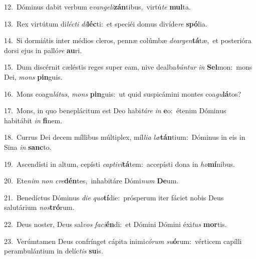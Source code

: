 {\numbfont\textcolor{\numbcolor}{12.}}~Dóminus dabit verbum e\-\textit{van}\-\textit{ge}\textit{li}\textbf{zán}tibus,~\star virtú\textit{te} \textbf{mul}\-ta.\par
{\numbfont\textcolor{\numbcolor}{13.}}~Rex virtútum di\-\textit{léc}\-\textit{ti} \textit{di}\-\textbf{léc}ti:~\star et speciéi domus divíde\textit{re} \textbf{spó}\-lia.\par
{\numbfont\textcolor{\numbcolor}{14.}}~Si dormiátis inter médios cleros, pennæ colúmbæ \textit{de}\-\textit{ar}\textit{gen}\textbf{tá}tæ,~\star et posterióra dorsi ejus in palló\textit{re} \textbf{au}\-ri.\par
{\numbfont\textcolor{\numbcolor}{15.}}~Dum discérnit cæléstis reges super eam, nive dealba\-\textit{bún}\-\textit{tur} \textit{in} \textbf{Sel}\-mon:~\star mons Dei, \textit{mons} \textbf{pin}\-guis.\par
{\numbfont\textcolor{\numbcolor}{16.}}~Mons coagu\-\textit{lá}\-\textit{tus}, \textit{mons} \textbf{pin}\-guis:~\star ut quid suspicámini montes coa\-\textit{gu}\-\textbf{lá}tos?\par
{\numbfont\textcolor{\numbcolor}{17.}}~Mons, in quo beneplácitum est Deo habi\-\textit{tá}\-\textit{re} \textit{in} \textbf{e}\-o:~\star étenim Dóminus habitábit \textit{in} \textbf{fi}\-nem.\par
{\numbfont\textcolor{\numbcolor}{18.}}~Currus Dei decem míllibus múltiplex, míl\-\textit{li}\-\textit{a} \textit{læ}\-\textbf{tán}tium:~\star Dóminus in eis in Sina \textit{in} \textbf{sanc}\-to.\par
{\numbfont\textcolor{\numbcolor}{19.}}~Ascendísti in altum, cepísti \textit{cap}\-\textit{ti}\textit{vi}\textbf{tá}tem:~\star accepísti dona in \textit{ho}\-\textbf{mí}nibus.\par
{\numbfont\textcolor{\numbcolor}{20.}}~Ete\textit{nim} \textit{non} \textit{cre}\-\textbf{dén}tes,~\star inhabitáre Dómi\textit{num} \textbf{De}\-um.\par
{\numbfont\textcolor{\numbcolor}{21.}}~Benedíctus Dóminus \textit{di}\-\textit{e} \textit{quo}\-\textbf{tí}die:~\star prósperum iter fáciet nobis Deus salutárium \textit{nos}\-\textbf{tró}rum.\par
{\numbfont\textcolor{\numbcolor}{22.}}~Deus noster, Deus sal\textit{vos} \textit{fa}\-\textit{ci}\textbf{én}di:~\star et Dómini Dómini éxi\textit{tus} \textbf{mor}\-tis.\par
{\numbfont\textcolor{\numbcolor}{23.}}~Verúmtamen Deus confrínget cápita inimi\-\textit{có}\-\textit{rum} \textit{su}\-\textbf{ó}rum:~\star vérticem capílli perambulántium in delíc\textit{tis} \textbf{su}\-is.\par
